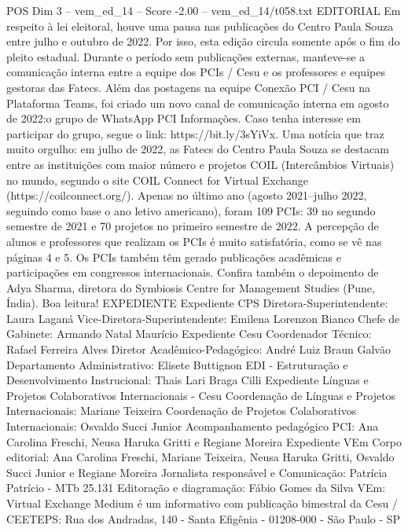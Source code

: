 \begin{textsample}{POS Dim 3 – vem\_ed\_14 – Score -2.00 – vem\_ed\_14/t058.txt}  \label{ex:f3_pos_035}
EDITORIAL Em respeito à lei eleitoral, houve uma pausa nas publicações do Centro Paula Souza entre julho e outubro de 2022.
Por isso, esta edição circula somente após o fim do pleito estadual.
Durante o período sem publicações externas, manteve-se a comunicação interna entre a equipe dos PCIs / Cesu e os professores e equipes gestoras das Fatecs.
Além das postagens na equipe Conexão PCI / Cesu na Plataforma Teams, foi criado um novo canal de comunicação interna em agosto de 2022:o grupo de WhatsApp PCI Informações.
Caso tenha interesse em participar do grupo, segue o link: https://bit.ly/3sYiVx.
Uma notícia que traz muito orgulho: em julho de 2022, as Fatecs do Centro Paula Souza se destacam entre as instituições com maior número e projetos COIL (Intercâmbios Virtuais) no mundo, segundo o site COIL Connect for Virtual Exchange (https://coilconnect.org/).
Apenas no último ano (agosto 2021–julho 2022, seguindo como base o ano letivo americano), foram 109 PCIs: 39 no segundo semestre de 2021 e 70 projetos no primeiro semestre de 2022.
A percepção de alunos e professores que realizam os PCIs é muito satisfatória, como se vê nas páginas 4 e 5.
Os PCIs também têm gerado publicações acadêmicas e participações em congressos internacionais.
Confira também o depoimento de Adya Sharma, diretora do Symbiosis Centre for Management Studies (Pune, Índia).
Boa leitura!
EXPEDIENTE Expediente CPS Diretora-Superintendente: Laura Laganá Vice-Diretora-Superintendente: Emilena Lorenzon Bianco Chefe de Gabinete: Armando Natal Maurício Expediente Cesu Coordenador Técnico: Rafael Ferreira Alves Diretor Acadêmico-Pedagógico: André Luiz Braun Galvão Departamento Administrativo: Elisete Buttignon EDI - Estruturação e Desenvolvimento Instrucional: Thais Lari Braga Cilli Expediente Línguas e Projetos Colaborativos Internacionais - Cesu Coordenação de Línguas e Projetos Internacionais: Mariane Teixeira Coordenação de Projetos Colaborativos Internacionais: Osvaldo Succi Junior Acompanhamento pedagógico PCI: Ana Carolina Freschi, Neusa Haruka Gritti e Regiane Moreira Expediente VEm Corpo editorial: Ana Carolina Freschi, Mariane Teixeira, Neusa Haruka Gritti, Osvaldo Succi Junior e Regiane Moreira Jornalista responsável e Comunicação: Patrícia Patrício - MTb 25.131 Editoração e diagramação: Fábio Gomes da Silva VEm: Virtual Exchange Medium é um informativo com publicação bimestral da Cesu / CEETEPS: Rua dos Andradas, 140 - Santa Efigênia - 01208-000 - São Paulo - SP

\end{textsample}
